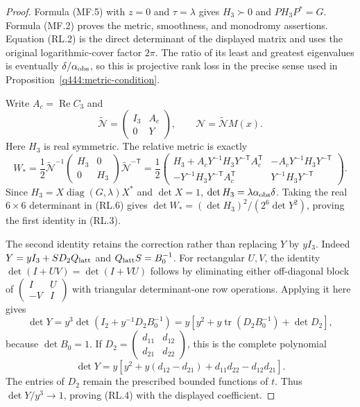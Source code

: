 \begin{proof}
Formula (MF.5) with $z=0$ and $\tau=\lambda$ gives $H_3\succ0$ and
$PH_3P^*=G$.  Formula (MF.2) proves the metric, smoothness, and monodromy
assertions.  Equation (RL.2) is the direct determinant of the displayed
matrix and uses the original logarithmic-cover factor $2\pi$.
The ratio of its least and greatest eigenvalues is eventually
$\delta/\alpha_{\rm obs}$, so this is projective rank loss in the
precise sense used in Proposition~\ref{q444:metric-condition}.

Write $A_c=\operatorname{Re}C_3$ and
\[
 \widetilde{\mathcal N}=
 \begin{pmatrix}I_3&A_c\\0&Y\end{pmatrix},\qquad
 \mathcal N=\widetilde{\mathcal N}M(x).
\]
Here $H_3$ is real symmetric.  The relative metric is exactly
\[
 W_*=\frac12\widetilde{\mathcal N}^{-1}
       \begin{pmatrix}H_3&0\\0&H_3\end{pmatrix}
       \widetilde{\mathcal N}^{-\mathsf T}
 =\frac12\begin{pmatrix}
 H_3+A_cY^{-1}H_3Y^{-\mathsf T}A_c^{\mathsf T}
       &-A_cY^{-1}H_3Y^{-\mathsf T}\\
 -Y^{-1}H_3Y^{-\mathsf T}A_c^{\mathsf T}
       &Y^{-1}H_3Y^{-\mathsf T}
 \end{pmatrix}.                                               \tag{RL.6}
\]
Since $H_3=X\operatorname{diag}(G,\lambda)X^*$ and $\det X=1$,
$\det H_3=\lambda\alpha_{\rm obs}\delta$.
Taking the real $6\times6$ determinant in (RL.6) gives
$\det W_*=(\det H_3)^2/(2^6\det Y^2)$, proving the first identity
in (RL.3).

The second identity retains the correction rather than replacing $Y$
by $yI_3$.  Indeed
$Y=yI_3+SD_2Q_{\rm latt}$ and $Q_{\rm latt}S=B_0^{-1}$.
For rectangular $U,V$, the identity
$\det(I+UV)=\det(I+VU)$ follows by eliminating either off-diagonal
block of $\left(\begin{smallmatrix}I&U\\-V&I\end{smallmatrix}\right)$
with triangular determinant-one row operations.  Applying it here gives
\[
 \det Y
 =y^3\det\left(I_2+y^{-1}D_2B_0^{-1}\right)
 =y\left[y^2+y\operatorname{tr}(D_2B_0^{-1})+\det D_2\right],
\]
because $\det B_0=1$.  If
$D_2=\left(\begin{smallmatrix}d_{11}&d_{12}\\d_{21}&d_{22}
\end{smallmatrix}\right)$, this is the complete polynomial
\[
 \det Y=y\left[y^2+y(d_{12}-d_{21})
                     +d_{11}d_{22}-d_{12}d_{21}\right].
\]
The entries of $D_2$ remain the prescribed bounded functions of $t$.
Thus $\det Y/y^3\to1$, proving (RL.4) with the displayed coefficient.


\end{proof}
